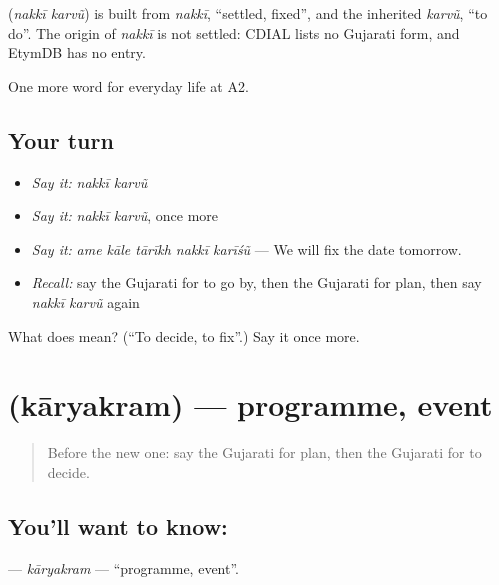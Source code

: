 \begin{cousinweb}
\textbf{ } (\emph{nakkī karvũ}) is built from \emph{nakkī}, \textquotedblleft{}settled, fixed\textquotedblright{}, and the inherited \emph{karvũ}, \textquotedblleft{}to do\textquotedblright{}. The origin of \emph{nakkī} is not settled: CDIAL lists no Gujarati form, and EtymDB has no entry.
\end{cousinweb}

\begin{grammarlens}[title={What you've built}]
One more word for everyday life at A2.
\end{grammarlens}

\subsection*{Your turn}
\begin{itemize}
\raggedright
  \item \emph{Say it:} \emph{nakkī karvũ}
  \item \emph{Say it:} \emph{nakkī karvũ}, once more
  \item \emph{Say it:} \emph{ame kāle tārīkh nakkī karīśũ} — We will fix the date tomorrow.
  \item \emph{Recall:} say the Gujarati for to go by, then the Gujarati for plan, then say \emph{nakkī karvũ} again
\end{itemize}

\begin{tcolorbox}[breakable,colback=teal!4,colframe=teal!35!black,title={Before you move on}]
What does   mean? (\textquotedblleft{}To decide, to fix\textquotedblright{}.) Say it once more.
\end{tcolorbox}
\section[\texorpdfstring{\gu{કાર્યક્રમ} (kāryakram)}{કાર્યક્રમ (kāryakram)}]{ (kāryakram) — programme, event}

\label{lesson:GU-C179-karyakram}



\begin{quote}
Before the new one: say the Gujarati for plan, then the Gujarati for to decide.
\end{quote}

\subsection*{You'll want to know: }
\textbf{} — \emph{kāryakram} — \textquotedblleft{}programme, event\textquotedblright{}.


